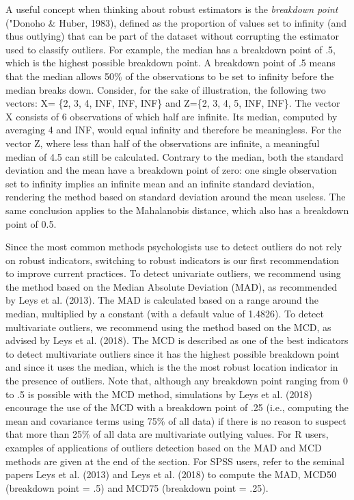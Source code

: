 \documentclass[man,floatsintext]{apa6}
\begin{document}
A useful concept when thinking about robust estimators is the \emph{breakdown point} ("Donoho \& Huber, 1983), defined as the proportion of values set to infinity (and thus outlying) that can be part of the dataset without corrupting the estimator used to classify outliers. For example, the median has a breakdown point of .5, which is the highest possible breakdown point. A breakdown point of .5 means that the median allows 50\% of the observations to be set to infinity before the median breaks down. Consider, for the sake of illustration, the following two vectors: X= \{2, 3, 4, INF, INF, INF\} and Z=\{2, 3, 4, 5, INF, INF\}. The vector X consists of 6 observations of which half are infinite. Its median, computed by averaging 4 and INF, would equal infinity and therefore be meaningless. For the vector Z, where less than half of the observations are infinite, a meaningful median of 4.5 can still be calculated. Contrary to the median, both the standard deviation and the mean have a breakdown point of zero: one single observation set to infinity implies an infinite mean and an infinite standard deviation, rendering the method based on standard deviation around the mean useless. The same conclusion applies to the Mahalanobis distance, which also has a breakdown point of 0.5.

Since the most common methods psychologists use to detect outliers do not rely on robust indicators, switching to robust indicators is our first recommendation to improve current practices. To detect univariate outliers, we recommend using the method based on the Median Absolute Deviation (MAD), as recommended by Leys et al. (2013). The MAD is calculated based on a range around the median, multiplied by a constant (with a default value of 1.4826). To detect multivariate outliers, we recommend using the method based on the MCD, as advised by Leys et al. (2018). The MCD is described as one of the best indicators to detect multivariate outliers since it has the highest possible breakdown point and since it uses the median, which is the the most robust location indicator in the presence of outliers. Note that, although any breakdown point ranging from 0 to .5 is possible with the MCD method, simulations by Leys et al. (2018) encourage the use of the MCD with a breakdown point of .25 (i.e., computing the mean and covariance terms using 75\% of all data) if there is no reason to suspect that more than 25\% of all data are multivariate outlying values. For R users, examples of applications of outliers detection based on the MAD and MCD methods are given at the end of the section. For SPSS users, refer to the seminal papers Leys et al. (2013) and Leys et al. (2018) to compute the MAD, MCD50 (breakdown point = .5) and MCD75 (breakdown point = .25).
\end{document}
